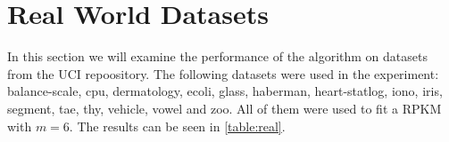 \section{Real World Datasets}

In this section we will examine the performance of the algorithm on datasets from the UCI repoository. The following datasets were used in the experiment: balance-scale, cpu, dermatology, ecoli, glass, haberman, heart-statlog, iono, iris, segment, tae, thy, vehicle, vowel and zoo. All of them were used to fit a RPKM with $m=6$. The results can be seen in \ref{table:real}. 

\begin{table}[ht!]
    \centering
\end{table}
